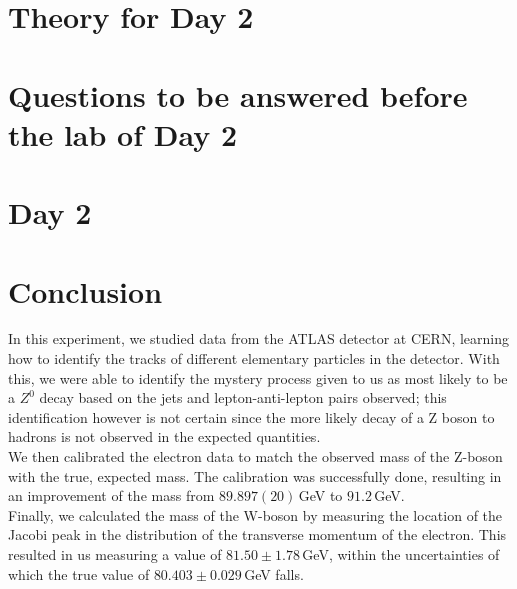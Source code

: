 \documentclass[sn-mathphys-num,icol]{sn-jnl}
\theoremstyle{thmstyleone}
\theoremstyle{thmstyletwo}
\theoremstyle{thmstylethree}
\begin{document}
\section{Theory for Day 2}


\section{Questions to be answered before the lab of Day 2}


\section{Day 2}


\section{Conclusion}
In this experiment, we studied data from the ATLAS detector at CERN, learning how to identify the tracks of different elementary particles in the detector. With this, we were able to identify the mystery process given to us as most likely to be a $Z^0$ decay based on the jets and lepton-anti-lepton pairs observed; this identification however is not certain since the more likely decay of a Z boson to hadrons is not observed in the expected quantities.\\

We then calibrated the electron data to match the observed mass of the Z-boson with the true, expected mass. The calibration was successfully done, resulting in an improvement of the mass from $89.897(20)\,$GeV to $91.2\,$GeV.\\

Finally, we calculated the mass of the W-boson by measuring the location of the Jacobi peak in the distribution of the transverse momentum of the electron. This resulted in us measuring a value of $81.50\pm1.78\,$GeV, within the uncertainties of which the true value of $80.403\pm0.029\,$GeV falls.
\end{document}
